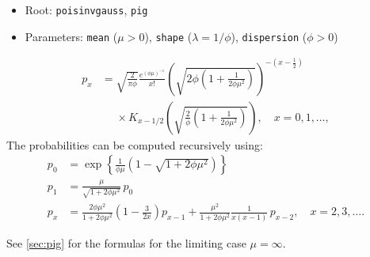 \documentclass[x11names]{article}
\newcommand{\code}[1]{\texttt{#1}}
\begin{document}
\begin{itemize}
\item Root: \code{poisinvgauss}, \code{pig}
\item Parameters: \code{mean} ($\mu > 0$),
  \code{shape} ($\lambda = 1/\phi$),
  \code{dispersion} ($\phi > 0$)
\end{itemize}
\begin{align*}
  p_x &= \sqrt{\frac{2}{\pi \phi}}
  \frac{e^{(\phi\mu)^{-1}}}{x!}
    \left(
      \sqrt{2\phi \left( 1 + \frac{1}{2\phi\mu^2} \right)}
    \right)^{-(x - \frac{1}{2})} \\
  &\phantom{=} \times
  K_{x - 1/2}
  \left(
    \sqrt{\frac{2}{\phi}\left(1 + \frac{1}{2\phi\mu^2}\right)}
  \right), \quad x = 0, 1, \dots,
\end{align*}
\noindent%
The probabilities can be computed recursively using:
\begin{align*}
  p_0 &= \exp\left\{
        \frac{1}{\phi\mu} \left(1 - \sqrt{1 + 2\phi\mu^2}\right)
        \right\} \\
  p_1 &= \frac{\mu}{\sqrt{1 + 2\phi\mu^2}}\, p_0 \\
  p_x &= \frac{2\phi\mu^2}{1 + 2\phi\mu^2}
        \left( 1 - \frac{3}{2x} \right) p_{x - 1}  + \frac{\mu^2}{1 + 2\phi\mu^2}
        \frac{1}{x(x - 1)}\, p_{x - 2}, \quad x = 2, 3, \dots.
\end{align*}

\noindent%
See \autoref{sec:pig} for the formulas for the limiting case $\mu = \infty$.



\end{document}
